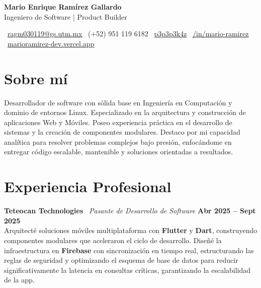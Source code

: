 \documentclass[a4paper,11pt]{article}
\newcommand{\entry}[4]{
  \vspace{1pt}
  {\bfseries #1} \textbullet\ \textit{#2} \hfill \textbf{\footnotesize #3} \\
  {\small #4} \par 
  \vspace{2pt}
}
\begin{document}
\pagestyle{empty}

\begin{center}
    {\LARGE \textbf{Mario Enrique Ramírez Gallardo}} \\ \vspace{1pt}
    {\large Ingeniero de Software | Product Builder} \\ \vspace{3pt}
    
    \small
    \faEnvelope\ \href{mailto:ragm030119@gs.utm.mx}{ragm030119@gs.utm.mx} \quad \textbullet \quad
    \faPhone\ (+52) 951 119 6182 \quad \textbullet \quad
    \faGithub\ \href{https://github.com/p3p3p3k4z}{p3p3p3k4z} \quad \textbullet \quad
    \faLinkedin\ \href{https://www.linkedin.com/in/mario-ramirez-abab9a318/}{/in/mario-ramirez} \\
    \faGlobe\ \href{https://marioramirez-dev.vercel.app/}{marioramirez-dev.vercel.app}
\end{center}

\vspace{-8pt}

\section*{Sobre mí}
\small Desarrollador de software con sólida base en Ingeniería en Computación y dominio de entornos Linux. Especializado en la arquitectura y construcción de aplicaciones Web y Móviles. Poseo experiencia práctica en el desarrollo de sistemas y la creación de componentes modulares. Destaco por mi capacidad analítica para resolver problemas complejos bajo presión, enfocándome en entregar código escalable, mantenible y soluciones orientadas a resultados.

\section*{Experiencia Profesional}

\entry{Teteocan Technologies}{Pasante de Desarrollo de Software}{Abr 2025 -- Sept 2025}
{Arquitecté soluciones móviles multiplataforma con \textbf{Flutter} y \textbf{Dart}, construyendo componentes modulares que aceleraron el ciclo de desarrollo. Diseñé la infraestructura en \textbf{Firebase} con sincronización en tiempo real, estructurando las reglas de seguridad y optimizando el esquema de base de datos para reducir significativamente la latencia en consultas críticas, garantizando la escalabilidad de la app.}
\end{document}
